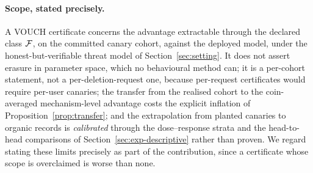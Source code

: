 \paragraph{Scope, stated precisely.} A VOUCH certificate concerns the advantage
extractable through the declared class $\mathcal{F}$, on the committed canary cohort, against
the deployed model, under the honest-but-verifiable threat model of
Section~\ref{sec:setting}. It does not assert erasure in parameter space, which no
behavioural method can; it is a per-cohort statement, not a per-deletion-request one,
because per-request certificates would require per-user canaries; the transfer from the realised
cohort to the coin-averaged mechanism-level advantage costs the explicit inflation of
Proposition~\ref{prop:transfer}; and the extrapolation from planted canaries to
organic records is \emph{calibrated} through the dose--response strata and the
head-to-head comparisons of Section~\ref{sec:exp-descriptive} rather than proven. We
regard stating these limits precisely as part of the contribution, since a certificate
whose scope is overclaimed is worse than none.
